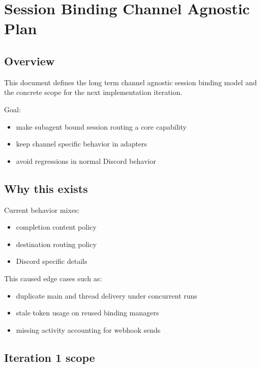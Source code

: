 \clearpage

\section{Session Binding Channel Agnostic Plan}


\subsection{Overview}


This document defines the long term channel agnostic session binding model and the concrete scope for the next implementation iteration.

Goal:

\begin{itemize}
  \item make subagent bound session routing a core capability
  \item keep channel specific behavior in adapters
  \item avoid regressions in normal Discord behavior
\end{itemize}


\subsection{Why this exists}


Current behavior mixes:

\begin{itemize}
  \item completion content policy
  \item destination routing policy
  \item Discord specific details
\end{itemize}


This caused edge cases such as:

\begin{itemize}
  \item duplicate main and thread delivery under concurrent runs
  \item stale token usage on reused binding managers
  \item missing activity accounting for webhook sends
\end{itemize}


\subsection{Iteration 1 scope}


